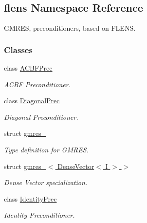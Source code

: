 \hypertarget{namespaceflens}{
\subsection{flens Namespace Reference}
\label{namespaceflens}
}
GMRES, preconditioners, based on FLENS.  


\subsubsection*{Classes}
\begin{CompactItemize}
\item 
class \hyperlink{classflens_1_1ACBFPrec}{ACBFPrec}
\begin{CompactList}\small\item\em ACBF Preconditioner. \item\end{CompactList}\item 
class \hyperlink{classflens_1_1DiagonalPrec}{DiagonalPrec}
\begin{CompactList}\small\item\em Diagonal Preconditioner. \item\end{CompactList}\item 
struct \hyperlink{structflens_1_1gmres__}{gmres\_\-}
\begin{CompactList}\small\item\em Type definition for GMRES. \item\end{CompactList}\item 
struct \hyperlink{structflens_1_1gmres___3_01DenseVector_3_01I_01_4_01_4}{gmres\_\-$<$ DenseVector$<$ I $>$ $>$}
\begin{CompactList}\small\item\em Dense Vector specialization. \item\end{CompactList}\item 
class \hyperlink{classflens_1_1IdentityPrec}{IdentityPrec}
\begin{CompactList}\small\item\em Identity Preconditioner. \item\end{CompactList}\end{CompactItemize}
